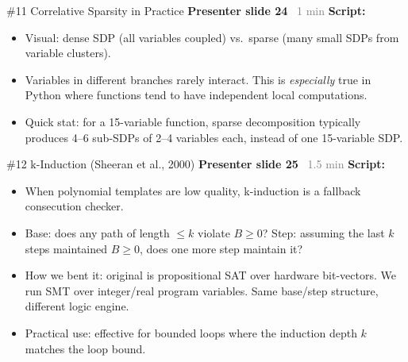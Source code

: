 \documentclass[aspectratio=169]{beamer}
\newcommand{\syncline}[2]{\textbf{#1} \hfill \textcolor{gray}{#2}}
\begin{document}
\begin{frame}{\#11 Correlative Sparsity in Practice}
\syncline{Presenter slide 24}{~1 min}
\textbf{Script:}
\begin{itemize}
  \item Visual: dense SDP (all variables coupled) vs.\ sparse (many small SDPs from variable clusters).
  \item Variables in different branches rarely interact. This is \emph{especially} true in Python where functions tend to have independent local computations.
  \item Quick stat: for a 15-variable function, sparse decomposition typically produces 4--6 sub-SDPs of 2--4 variables each, instead of one 15-variable SDP.
\end{itemize}
\end{frame}


\begin{frame}{\#12 k-Induction (Sheeran et al., 2000)}
\syncline{Presenter slide 25}{~1.5 min}
\textbf{Script:}
\begin{itemize}
  \item When polynomial templates are low quality, k-induction is a fallback consecution checker.
  \item Base: does any path of length $\le k$ violate $B \ge 0$? Step: assuming the last $k$ steps maintained $B \ge 0$, does one more step maintain it?
  \item How we bent it: original is propositional SAT over hardware bit-vectors. We run SMT over integer/real program variables. Same base/step structure, different logic engine.
  \item Practical use: effective for bounded loops where the induction depth $k$ matches the loop bound.
\end{itemize}
\end{frame}
\end{document}
